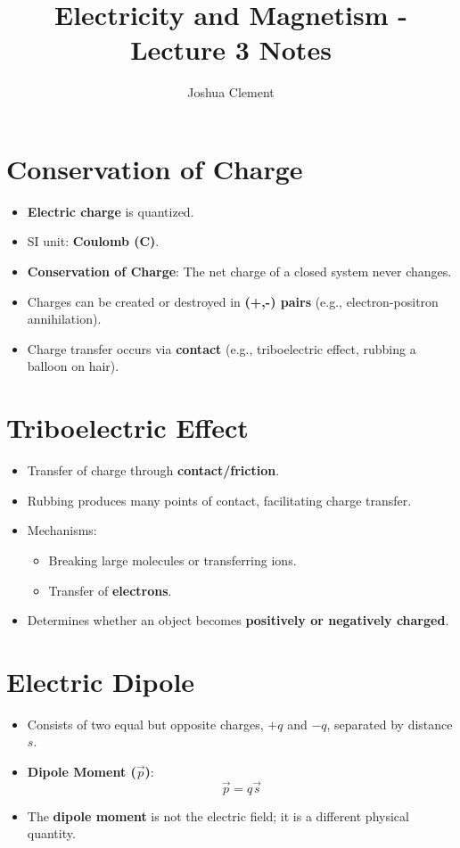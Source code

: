\documentclass{article}
\begin{document}
\title{Electricity and Magnetism - Lecture 3 Notes}
\author{Joshua Clement}
\maketitle

\section*{Conservation of Charge}
\begin{itemize}
    \item \textbf{Electric charge} is quantized.
    \item SI unit: \textbf{Coulomb (C)}.
    \item \textbf{Conservation of Charge}: The net charge of a closed system never changes.
    \item Charges can be created or destroyed in \textbf{(+,-) pairs} (e.g., electron-positron annihilation).
    \item Charge transfer occurs via \textbf{contact} (e.g., triboelectric effect, rubbing a balloon on hair).
\end{itemize}

\section*{Triboelectric Effect}
\begin{itemize}
    \item Transfer of charge through \textbf{contact/friction}.
    \item Rubbing produces many points of contact, facilitating charge transfer.
    \item Mechanisms:
    \begin{itemize}
        \item Breaking large molecules or transferring ions.
        \item Transfer of \textbf{electrons}.
    \end{itemize}
    \item Determines whether an object becomes \textbf{positively or negatively charged}.
\end{itemize}

\section*{Electric Dipole}
\begin{itemize}
    \item Consists of two equal but opposite charges, \(+q\) and \(-q\), separated by distance \(s\).
    \item \textbf{Dipole Moment (\(\vec{p}\))}:
    \[
    \vec{p} = q \vec{s}
    \]
    \item The \textbf{dipole moment} is not the electric field; it is a different physical quantity.
\end{itemize}
\end{document}

